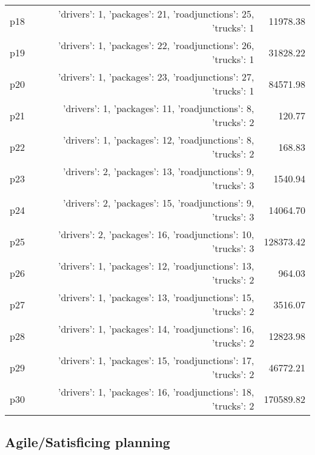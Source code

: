 \documentclass{article}
\begin{document}
\begin{center}
\begin{tabular}{@{}l|r|r@{}}
  p18&{'drivers': 1, 'packages': 21, 'roadjunctions': 25, 'trucks': 1}&11978.38\\
  p19&{'drivers': 1, 'packages': 22, 'roadjunctions': 26, 'trucks': 1}&31828.22\\
  p20&{'drivers': 1, 'packages': 23, 'roadjunctions': 27, 'trucks': 1}&84571.98\\
  p21&{'drivers': 1, 'packages': 11, 'roadjunctions': 8, 'trucks': 2}&120.77\\
  p22&{'drivers': 1, 'packages': 12, 'roadjunctions': 8, 'trucks': 2}&168.83\\
  p23&{'drivers': 2, 'packages': 13, 'roadjunctions': 9, 'trucks': 3}&1540.94\\
  p24&{'drivers': 2, 'packages': 15, 'roadjunctions': 9, 'trucks': 3}&14064.70\\
  p25&{'drivers': 2, 'packages': 16, 'roadjunctions': 10, 'trucks': 3}&128373.42\\
  p26&{'drivers': 1, 'packages': 12, 'roadjunctions': 13, 'trucks': 2}&964.03\\
  p27&{'drivers': 1, 'packages': 13, 'roadjunctions': 15, 'trucks': 2}&3516.07\\
  p28&{'drivers': 1, 'packages': 14, 'roadjunctions': 16, 'trucks': 2}&12823.98\\
  p29&{'drivers': 1, 'packages': 15, 'roadjunctions': 17, 'trucks': 2}&46772.21\\
  p30&{'drivers': 1, 'packages': 16, 'roadjunctions': 18, 'trucks': 2}&170589.82
                            \end{tabular}
                            \end{center}
                    

                                \subsection*{Agile/Satisficing planning}
                                
\end{document}
